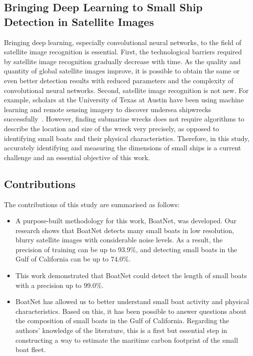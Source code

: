 \subsection{Bringing Deep Learning to Small Ship Detection in Satellite Images}
Bringing deep learning, especially convolutional neural networks, to the field of satellite image recognition is essential. First, the technological barriers required by satellite image recognition gradually decrease with time. As the quality and quantity of global satellite images improve, it is possible to obtain the same or even better detection results with reduced parameters and the  complexity of convolutional neural networks. Second, satellite image recognition is not new. For example, scholars at the University of Texas at Austin have been using machine learning and remote sensing imagery to discover undersea shipwrecks successfully~\cite{character2021archaeologic}. However, finding submarine wrecks does not require algorithms to describe the location and size of the wreck very precisely, as opposed to identifying small boats and their physical characteristics. Therefore, in this study, accurately identifying and measuring the dimensions of small ships is a current challenge and an essential objective of this work.


\subsection{Contributions}
The contributions of this study are summarised as follows:
\begin{itemize}
    \item A purpose-built methodology for this work, BoatNet, was developed. Our research shows that BoatNet detects many small boats in low resolution, blurry satellite images with considerable noise levels. As a result, the precision of training can be up to 93.9\%, and detecting small boats in the Gulf of California can be up to 74.0\%.

    \item This work demonstrated that BoatNet could detect the length of small boats with a precision up to 99.0\%.

    \item BoatNet has allowed us to better understand small boat activity and physical characteristics. Based on this, it has been possible to answer questions about the composition of small boats in the Gulf of California. Regarding the authors' knowledge of the literature, this is a first but essential step in constructing a way to estimate the maritime carbon footprint of the small boat fleet.
\end{itemize}
